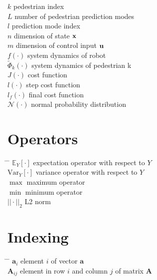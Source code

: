 \begin{tabbing}
$k$ \> pedestrian index \\[0.5ex]
$L$ \> number of pedestrian prediction modes \\[0.5ex]
$l$ \> prediction mode index \\[0.5ex]
$n$ \> dimension of state $\mathbf{x}$ \\[0.5ex]
$m$ \> dimension of control input $\mathbf{u}$ \\[0.5ex]
$f(\cdot)$ \> system dynamics of robot \\[0.5ex]
$\tilde{\Phi}_k(\cdot)$ \> system dynamics of pedestrian k \\[0.5ex]
$J(\cdot)$ \> cost function \\[0.5ex]
$l(\cdot)$ \> step cost function \\[0.5ex]
$l_f(\cdot)$ \> final cost function \\[0.5ex]
$\mathcal{N}(\cdot)$ \> normal probability distribution \\[0.5ex]
\end{tabbing}

\section*{Operators}
\begin{tabbing}
\hspace*{1.6cm} \= \hspace*{8cm} \= \kill
$\mathbb{E}_Y[\cdot]$ \> expectation operator with respect to $Y$ \\[0.5ex]
$\mathrm{Var}_Y[\cdot]$ \> variance operator with respect to $Y$ \\[0.5ex]
$\max$ \> maximum operator \\[0.5ex]
$\min$ \> minimum operator \\[0.5ex]
$||\cdot||_2$ \> L2 norm \\[0.5ex]
\end{tabbing}

\section*{Indexing}
\begin{tabbing}
\hspace*{1.6cm} \= \hspace*{8cm} \= \kill
$\mathbf{a}_i$ \> element $i$ of vector $\mathbf{a}$ \\[0.5ex]
$\mathbf{A}_{ij}$ \> element in row $i$ and column $j$ of matrix $\mathbf{A}$ \\[0.5ex]
\end{tabbing}


